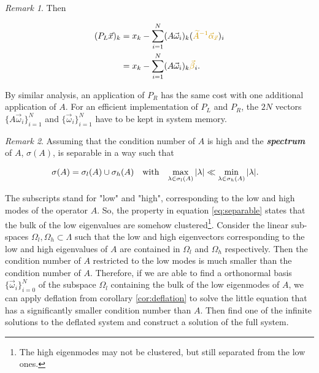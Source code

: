 \documentclass{article}
\theoremstyle{plain} %
\theoremstyle{convention} %
\theoremstyle{remark} %
\newtheorem*{remark}{Remark} %
\def\df#1{\textbf{\textit{#1}}}
\numberwithin{equation}{section}
\begin{document}
\begin{remark}
Then

\begin{align*}
    (P_L\vec{x})_k &= x_k - \sum_{i=1}^N (A\vec{\omega}_i)_k ( \textcolor{cyellow}{\widetilde{A}^{-1} \vec{\alpha}_{\vec{x}}} )_i \\
    &= x_k - \sum_{i=1}^N (A\vec{\omega}_i)_k \textcolor{cyellow}{\vec{\beta}}_i.
\end{align*}

By similar analysis, an application of $P_R$ has the same cost with one additional application of $A$. For an efficient implementation of $P_L$ and $P_R$, the $2N$ vectors $\{A\vec{\omega}_i\}_{i=1}^N$ and $\{\vec{\omega}_i\}_{i=1}^N$ have to be kept in system memory.

\end{remark}

\begin{remark}


Assuming that the condition number of $A$ is high and the \df{spectrum} of $A$, $\sigma(A)$, is separable in a way such that

\begin{align}
    \sigma(A) &= \sigma_l(A) \cup \sigma_h(A)
    & &\text{with} &
    \max\limits_{\lambda \in \sigma_l(A)} \abs{\lambda} &\ll \min\limits_{\lambda \in \sigma_h(A)} \abs{\lambda}. \label{eq:separable}
\end{align}

The subscripts stand for "low" and "high", corresponding to the low and high modes of the operator $A$. So, the property in equation \eqref{eq:separable} states that the bulk of the low eigenvalues are somehow clustered\footnote{The high eigenmodes may not be clustered, but still separated from the low ones.}. Consider the linear sub-spaces $\Omega_l, \Omega_h \subset \Lambda$ such that the low and high eigenvectors corresponding to the low and high eigenvalues of $A$ are contained in $\Omega_l$ and $\Omega_h$ respectively. Then the condition number of $A$ restricted to the low modes is much smaller than the condition number of $A$. Therefore, if we are able to find a orthonormal basis $\{\vec{\omega}_i\}_{i=0}^N$ of the subspace $\Omega_l$ containing the bulk of the low eigenmodes of $A$, we can apply deflation from corollary \ref{cor:deflation} to solve the little equation that has a significantly smaller condition number than $A$. Then find one of the infinite solutions to the deflated system and construct a solution of the full system.


\end{remark}
\end{document}
